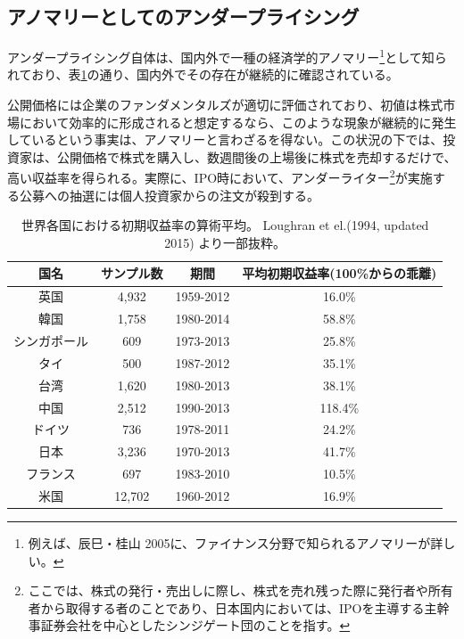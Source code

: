 \documentclass{jsarticle}
\begin{document}
\subsection{アノマリーとしてのアンダープライシング}
アンダープライシング自体は、国内外で一種の経済学的アノマリー\footnote[3]{例えば、辰巳・桂山 2005\cite{tatsumi}に、ファイナンス分野で知られるアノマリーが詳しい。}として知られており、表\ref{around_world}の通り、国内外でその存在が継続的に確認されている。 \par
公開価格には企業のファンダメンタルズが適切に評価されており、初値は株式市場において効率的に形成されると想定するなら、このような現象が継続的に発生しているという事実は、アノマリーと言わざるを得ない。この状況の下では、投資家は、公開価格で株式を購入し、数週間後の上場後に株式を売却するだけで、高い収益率を得られる。実際に、IPO時において、アンダーライター\footnote[4]{ここでは、株式の発行・売出しに際し、株式を売れ残った際に発行者や所有者から取得する者のことであり、日本国内においては、IPOを主導する主幹事証券会社を中心としたシンジゲート団のことを指す。}が実施する公募への抽選には個人投資家からの注文が殺到する。

\begin{table}[h]
	\caption{世界各国における初期収益率の算術平均。
	Loughran et el.(1994, updated 2015) \cite{Loughran}より一部抜粋。}
	\label{around_world}
	\centering
	\begin{tabular}{cccc}
		\hline
		国名&サンプル数&期間&平均初期収益率(100\%からの乖離) \\
		\hline \hline
		英国&4,932&1959-2012&16.0\% \\
		韓国&1,758&1980-2014& 58.8\% \\
		シンガポール&609&1973-2013&25.8\% \\
		タイ&500&1987-2012&35.1\%\\
		台湾 &1,620 &1980-2013&38.1\% \\
		中国&2,512&1990-2013&118.4\%\\
		ドイツ&736&1978-2011&24.2\% \\
		日本&3,236&1970-2013&41.7\% \\
		フランス & 697 & 1983-2010 & 10.5\% \\
		米国&12,702&1960-2012&16.9\%\\
		\hline
	\end{tabular}
\end{table}
\end{document}
